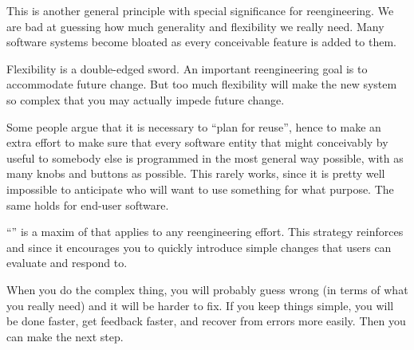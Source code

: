 \documentclass[a4paper,10pt,twoside]{book}
\begin{document}

\discussion
This is another general principle with special significance for reengineering. We are bad at guessing how much generality and flexibility we really need. Many software systems become bloated as every conceivable feature is added to them.

Flexibility is a double-edged sword. An important reengineering goal is to accommodate future change. But too much flexibility will make the new system so complex that you may actually impede future change.

Some people argue that it is necessary to ``plan for reuse'', hence to make an extra effort to make sure that every software entity that might conceivably by useful to somebody else is programmed in the most general way possible, with as many knobs and buttons as possible. This rarely works, since it is pretty well impossible to anticipate who will want to use something for what purpose. The same holds for end-user software.

``'' is a maxim of  \cite{Beck00a} that applies to any reengineering effort. This strategy reinforces  and  since it encourages you to quickly introduce simple changes that users can evaluate and respond to.

When you do the complex thing, you will probably guess wrong (in terms of what you really need) and it will be harder to fix. If you keep things simple, you will be done faster, get feedback faster, and recover from errors more easily. Then you can make the next step.

\ifx\wholebook\relax\else
   
   
   
\end{document}
